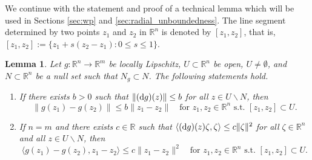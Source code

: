 \documentclass[a4paper,11pt]{article}
\newcommand{\R}{\mathbb R}
\numberwithin{equation}{section}
\numberwithin{figure}{section}
\numberwithin{table}{section}
\newtheorem{corollary}[theorem]{Corollary}
\newtheorem{lemma}[theorem]{Lemma}
\begin{document}
%
%
We continue with the statement and proof of a technical lemma which will be used in Sections \ref{sec:wp} and \ref{sec:radial_unboundedness}. The line segment determined by two points $z_1$ and $z_2$ in $\R^n$ is denoted by $[z_1,z_2]$, that is, $[z_1,z_2]:=\{z_1+s(z_2-z_1):0\leq s\leq 1\}$.
%
\begin{lemma}\label{lem:derivative_bounds}
Let $g:\R^n\to\R^m$ be locally Lipschitz, $U\subset\R^n$ be open, $U\not=\emptyset$, and
$N\subset\R^n$ be a null set such that $N_g\subset N$. The following
statements hold.
\begin{enumerate}[label = {\bf (\arabic*)}, ref={\rm (\arabic*)}, leftmargin = 0ex, itemindent = 4.6ex]
\item\label{ls:derivative_bounds_s_1}
If there exists $b>0$ such that $\|({\rm d}g)(z)\|\leq b$ for all $z\in U\backslash N$, then
\begin{equation}\label{eq:g_lipschitz}
\|g(z_1)-g(z_2)\|\leq b\|z_1-z_2\|\quad\mbox{for $z_1,z_2\in\R^n$ s.t. $[z_1,z_2]\subset U$}.
\end{equation}
\item\label{ls:derivative_bounds_s_2}
If $n=m$ and there exists $c\in\R$ such that $\langle ({\rm d}g)(z)\zeta,\zeta\rangle\leq c\|\zeta\|^2$ for all $\zeta\in\R^n$ and all $z\in U\backslash N$, then
\begin{equation}\label{eq:g_mono}
\langle g(z_1)-g(z_2),z_1-z_2\rangle\leq c\|z_1-z_2\|^2\quad\mbox{for $z_1,z_2\in\R^n$ s.t. $[z_1,z_2]\subset U$}.
\end{equation}
\end{enumerate}
\end{lemma}
%
\end{document}
